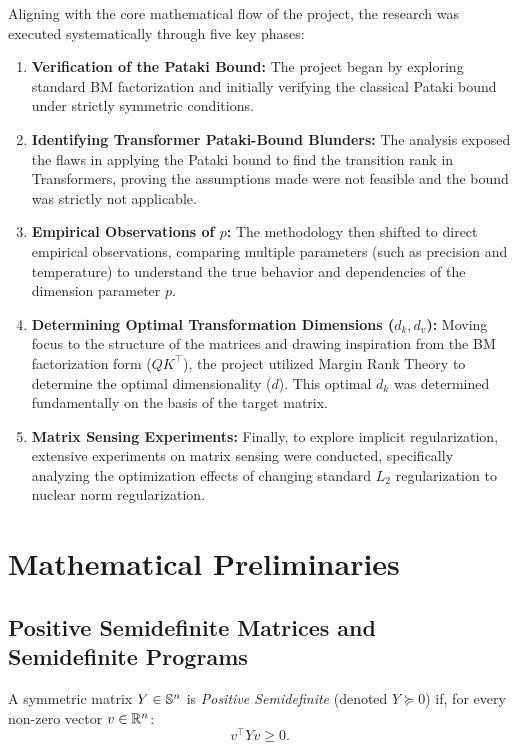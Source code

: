 Aligning with the core mathematical flow of the project, the research was executed systematically through five key phases:
\begin{enumerate}
    \item \textbf{Verification of the Pataki Bound:} The project began by exploring standard BM factorization and initially verifying the classical Pataki bound under strictly symmetric conditions.
    \item \textbf{Identifying Transformer Pataki-Bound Blunders:} The analysis exposed the flaws in applying the Pataki bound to find the transition rank in Transformers, proving the assumptions made were not feasible and the bound was strictly not applicable.
    \item \textbf{Empirical Observations of $p$:} The methodology then shifted to direct empirical observations, comparing multiple parameters (such as precision and temperature) to understand the true behavior and dependencies of the dimension parameter $p$.
    \item \textbf{Determining Optimal Transformation Dimensions ($d_k, d_v$):} Moving focus to the structure of the matrices and drawing inspiration from the BM factorization form ($QK^\top$), the project utilized Margin Rank Theory to determine the optimal dimensionality ($d$). This optimal $d_k$ was determined fundamentally on the basis of the target matrix.
    \item \textbf{Matrix Sensing Experiments:} Finally, to explore implicit regularization, extensive experiments on matrix sensing were conducted, specifically analyzing the optimization effects of changing standard $L_2$ regularization to nuclear norm regularization.
\end{enumerate}
\section{Mathematical Preliminaries}
\label{sec:prelim}

\subsection{Positive Semidefinite Matrices and Semidefinite Programs}

\begin{definition}
  A symmetric matrix $Y \in \mathbb{S}^n$ is \emph{Positive Semidefinite} (denoted $Y \succeq 0$)
  if, for every non-zero vector $v \in \mathbb{R}^n$:
  \begin{equation}
    v^\top Y v \geq 0.
  \end{equation}
\end{definition}

